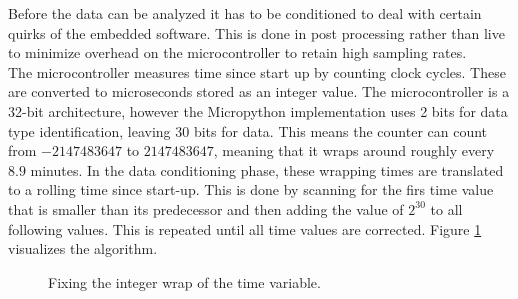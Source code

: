 Before the data can be analyzed it has to be conditioned to deal with certain quirks of the embedded software. This is done in post processing rather than live to minimize overhead on the microcontroller to retain high sampling rates.\\

The microcontroller measures time since start up by counting clock cycles. These are converted to microseconds stored as an integer value. The microcontroller is a 32-bit architecture, however the Micropython implementation uses 2 bits for data type identification, leaving 30 bits for data. This means the counter can count from $-2147483647$ to $2147483647$, meaning that it wraps around roughly every $8.9$ minutes. In the data conditioning phase, these wrapping times are translated to a rolling time since start-up. This is done by scanning for the firs time value that is smaller than its predecessor and then adding the value of $2^{30}$ to all following values. This is repeated until all time values are corrected. Figure \ref{fig:wrap} visualizes the algorithm.\\

\begin{figure}
	\begin{center}
		\caption{Fixing the integer wrap of the time variable.}
		\label{fig:wrap}
	\end{center}
\end{figure}